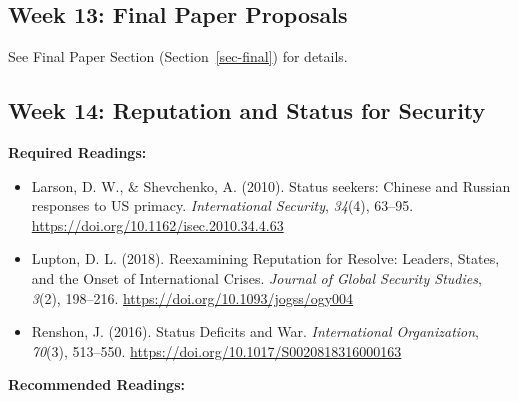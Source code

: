 \documentclass[
  letterpaper,
  DIV=11,
  numbers=noendperiod]{scrartcl}
\providecommand{\tightlist}{%
  \setlength{\itemsep}{0pt}\setlength{\parskip}{0pt}}\usepackage{longtable,booktabs,array}
\begin{document}
\hypertarget{week-13-final-paper-proposals}{%
\subsection*{Week 13: Final Paper
Proposals}\label{week-13-final-paper-proposals}}

See Final Paper Section (Section~\ref{sec-final}) for details.

\hypertarget{week-14-reputation-and-status-for-security}{%
\subsection*{Week 14: Reputation and Status for
Security}\label{week-14-reputation-and-status-for-security}}

\textbf{Required Readings:}

\begin{itemize}
\tightlist
\item
  Larson, D. W., \& Shevchenko, A. (2010). Status seekers: {Chinese} and
  {Russian} responses to {US} primacy. \emph{International Security},
  \emph{34}(4), 63--95. \url{https://doi.org/10.1162/isec.2010.34.4.63}
\item
  Lupton, D. L. (2018). Reexamining {Reputation} for {Resolve}:
  {Leaders}, {States}, and the {Onset} of {International} {Crises}.
  \emph{Journal of Global Security Studies}, \emph{3}(2), 198--216.
  \url{https://doi.org/10.1093/jogss/ogy004}
\item
  Renshon, J. (2016). Status {Deficits} and {War}. \emph{International
  Organization}, \emph{70}(3), 513--550.
  \url{https://doi.org/10.1017/S0020818316000163}
\end{itemize}

\textbf{Recommended Readings:}
\end{document}
